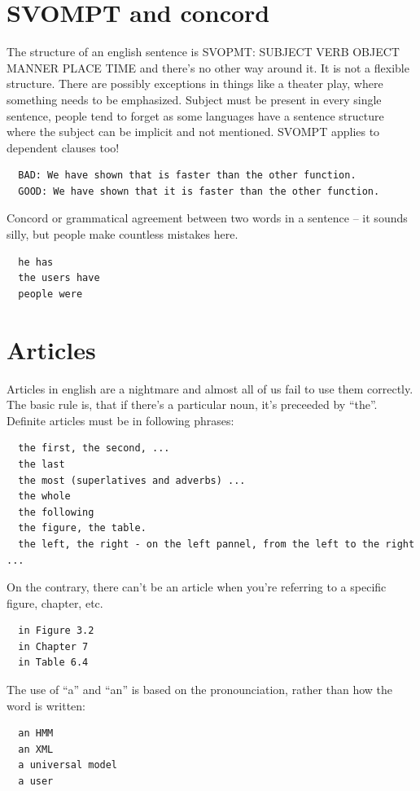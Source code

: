 \section*{SVOMPT and concord}

The structure of an english sentence is SVOPMT: SUBJECT VERB OBJECT MANNER PLACE TIME and there's no other way around it. It is not a flexible structure. There are possibly exceptions in things like a theater play, where something needs to be emphasized. Subject must be present in every single sentence, people tend to forget as some languages have a sentence structure where the subject can be implicit and not mentioned. SVOMPT applies to dependent clauses too!
\begin{verbatim}
  BAD: We have shown that is faster than the other function. 
  GOOD: We have shown that it is faster than the other function. 
\end{verbatim}

\noindent Concord or grammatical agreement between two words in a sentence -- it sounds silly, but people make countless mistakes here.

\begin{verbatim}
  he has 
  the users have 
  people were 
\end{verbatim}

\section*{Articles}

Articles in english are a nightmare and almost all of us fail to use them correctly. The basic rule is, that if there's a particular noun, it's preceeded by ``the''. Definite articles must be in following phrases:
\begin{verbatim}
  the first, the second, ...
  the last
  the most (superlatives and adverbs) ...
  the whole 
  the following 
  the figure, the table. 
  the left, the right - on the left pannel, from the left to the right ... 
\end{verbatim}

\noindent On the contrary, there can't be an article when you're referring to a specific figure, chapter, etc.
\begin{verbatim}
  in Figure 3.2
  in Chapter 7
  in Table 6.4
\end{verbatim}

\begin{samepage}
\noindent The use of ``a'' and ``an'' is based on the pronounciation, rather than how the word is written:
\begin{verbatim}
  an HMM
  an XML
  a universal model
  a user
\end{verbatim}
\end{samepage}

